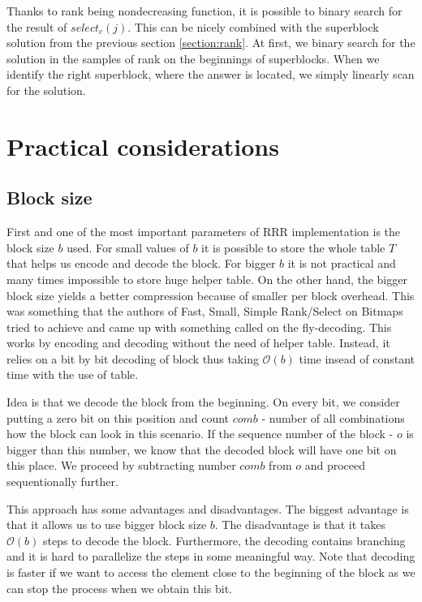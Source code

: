 Thanks to rank being nondecreasing function, it is possible to binary search for the result
of $select_c(j)$. This can be nicely combined with the superblock solution from the previous
section \ref{section:rank}. At first, we binary search for the solution in the samples of rank
on the beginnings of superblocks. When we identify the right superblock, where the answer is
located, we simply linearly scan for the solution.

\section{Practical considerations}

\subsection{Block size}

First and one of the most important parameters of RRR implementation is the block
size $b$ used. For small values of $b$ it is possible to store the whole table
$T$ that helps us encode and decode the block. For bigger $b$ it is not practical
and many times impossible to store huge helper table. On the other hand, the bigger
block size yields a better compression because of smaller per block overhead. This was
something that the authors of Fast, Small, Simple Rank/Select on Bitmaps tried to
achieve and came up with something called on the fly-decoding. This works by encoding
and decoding without the need of helper table. Instead, it relies on a bit by bit decoding
of block thus taking $\mathcal{O}(b)$ time insead of constant time with the use of table.

Idea is that we decode the block from the beginning. On every bit, we consider putting a
zero bit on this position and count $comb$ - number of all combinations how the block can
look in this scenario. If the sequence number of the block - $o$ is bigger than this number,
we know that the decoded block will have one bit on this place. We proceed by subtracting
number $comb$ from $o$ and proceed sequentionally further.

This approach has some advantages and disadvantages. The biggest advantage is that it allows
us to use bigger block size $b$. The disadvantage is that it takes $\mathcal{O}(b)$ steps to decode the
block. Furthermore, the decoding contains branching and it is hard to parallelize the steps
in some meaningful way. Note that decoding is faster if we want to access the element
close to the beginning of the block as we can stop the process when we obtain this bit.